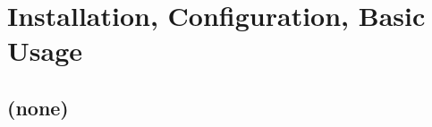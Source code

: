 
\cleardoublepage


\setcounter{chapter}{-1}
\chapter{Installation, Configuration, Basic Usage}

\hfill \break

\newpage

\section{(none)}

